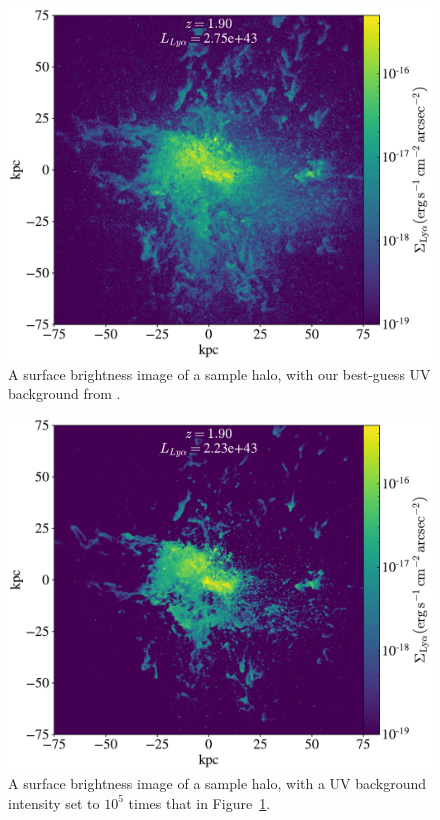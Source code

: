 \begin{figure}
    \centering
    \includegraphics[width=\textwidth,keepaspectratio]{figures/big_uvb_000.pdf}
    \caption{
        A surface brightness image of a sample halo, with our best-guess UV background from \citet{Faucher-Giguere2009}.
    }
  \label{fig:big_uv_000}
\end{figure}

\begin{figure}
    \centering
    \includegraphics[width=\textwidth,keepaspectratio]{figures/big_uvb_005.pdf}
    \caption{
        A surface brightness image of a sample halo, with a UV background intensity set to $10^{5}$ times that in Figure~\ref{fig:big_uv_000}.
    }
  \label{fig:big_uv_005}
\end{figure}



